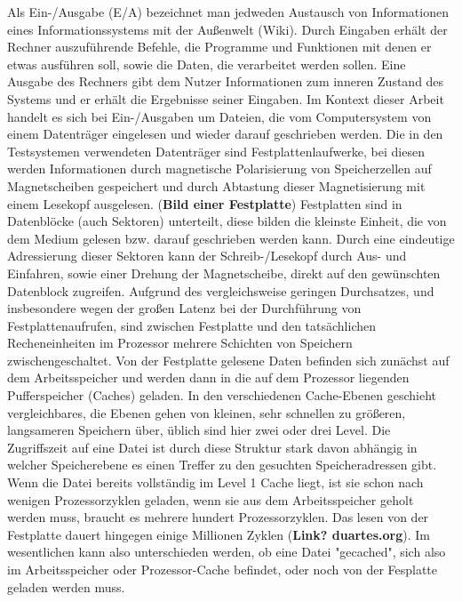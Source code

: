 \documentclass[
	12pt,
	a4paper,
	BCOR10mm,
	DIV14,
	listof=totoc,
	bibliography=totoc,
	headsepline
]{scrreprt}
\begin{document}
Als Ein-/Ausgabe (E/A) bezeichnet man jedweden Austausch von Informationen eines Informationssystems mit der Außenwelt (Wiki). Durch Eingaben erhält der Rechner auszuführende Befehle, die Programme und Funktionen mit denen er etwas ausführen soll, sowie die Daten, die verarbeitet werden sollen. Eine Ausgabe des Rechners gibt dem Nutzer Informationen zum inneren Zustand des Systems und er erhält die Ergebnisse seiner Eingaben.
Im Kontext dieser Arbeit handelt es sich bei Ein-/Ausgaben um Dateien, die vom Computersystem von einem Datenträger eingelesen und wieder darauf geschrieben werden.
Die in den Testsystemen verwendeten Datenträger sind Festplattenlaufwerke, bei diesen werden Informationen durch magnetische Polarisierung von Speicherzellen auf Magnetscheiben gespeichert und durch Abtastung dieser Magnetisierung mit einem Lesekopf ausgelesen. (\textbf{Bild einer Festplatte})
Festplatten sind in Datenblöcke (auch Sektoren) unterteilt, diese bilden die kleinste Einheit, die von dem Medium gelesen bzw. darauf geschrieben werden kann. Durch eine eindeutige Adressierung dieser Sektoren kann der Schreib-/Lesekopf durch Aus- und Einfahren, sowie einer Drehung der Magnetscheibe, direkt auf den gewünschten Datenblock zugreifen.
Aufgrund des vergleichsweise geringen Durchsatzes, und insbesondere wegen der großen Latenz bei der Durchführung von Festplattenaufrufen, sind zwischen Festplatte und den tatsächlichen Recheneinheiten im Prozessor mehrere Schichten von Speichern zwischengeschaltet. Von der Festplatte gelesene Daten befinden sich zunächst auf dem Arbeitsspeicher und werden dann in die auf dem Prozessor liegenden Pufferspeicher (Caches) geladen. In den verschiedenen Cache-Ebenen geschieht vergleichbares, die Ebenen gehen von kleinen, sehr schnellen zu größeren, langsameren Speichern über, üblich sind hier zwei oder drei Level. 
Die Zugriffszeit auf eine Datei ist durch diese Struktur stark davon abhängig in welcher Speicherebene es einen Treffer zu den gesuchten Speicheradressen gibt. Wenn die Datei bereits vollständig im Level 1 Cache liegt, ist sie schon nach wenigen Prozessorzyklen geladen, wenn sie aus dem Arbeitsspeicher geholt werden muss, braucht es mehrere hundert Prozessorzyklen. Das lesen von der Festplatte dauert hingegen einige Millionen Zyklen (\textbf{Link? duartes.org}). Im wesentlichen kann also unterschieden werden, ob eine Datei "gecached", sich also im Arbeitsspeicher oder Prozessor-Cache befindet, oder noch von der Fesplatte geladen werden muss.
\end{document}
